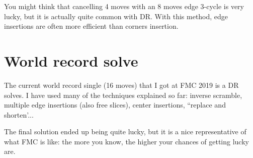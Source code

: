 \documentclass[11pt,a4paper]{book}
\begin{document}
You might think that cancelling 4 moves with an 8 moves edge 3-cycle is very lucky, but it is actually quite common with DR. With this method, edge insertions are often more efficient than corners insertion.

\section{World record solve}

The current world record single (16 moves) that I got at FMC 2019 is a DR solves. I have used many of the techniques explained so far: inverse scramble, multiple edge insertions (also free slices), center insertions, ``replace and shorten'... 

The final solution ended up being quite lucky, but it is a nice representative of what FMC is like: the more you know, the higher your chances of getting lucky are.
\end{document}
